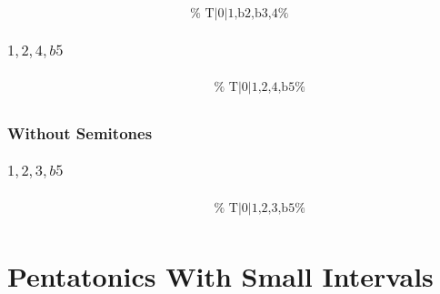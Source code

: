 \documentclass[english]{./gbook}
\begin{document}
\begin{large}
\[\begin{array}{ll}
&
	\text{
	}
\end{array}
\]


\subsection*{$1,2,4,b5$}
\[
\begin{array}{ll}
	\begin{array}{c}
		\begin{array}{ccc}
			&%
			&%
		\end{array}
		\\
		\begin{array}{cc}
			&%
		\end{array}
	\end{array}

&
	\text{
	}
\end{array}
\]


\subsection*{Without Semitones}

\subsection*{$1,2,3,b5$}
\[
\begin{array}{ll}
	\begin{array}{c}
		\begin{array}{ccc}
			&%
			&%
		\end{array}
		\\
		\begin{array}{cc}
			&%
		\end{array}
	\end{array}

&
	\text{
	}
\end{array}
\]







\chapter{\mbox{Pentatonics} \mbox{With} \mbox{Small} \mbox{Intervals}}



\end{large}
\end{document}
